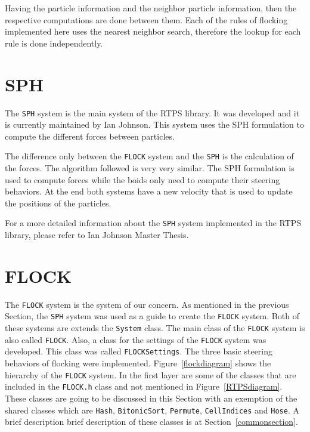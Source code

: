 Having the particle information and the neighbor particle information, then the respective computations are done between them. Each of the rules of flocking implemented here uses the nearest neighbor search, therefore the lookup for each rule is done independently.

\section{SPH}\label{sphsection}
The \texttt{SPH} system is the main system of the RTPS library. It was developed and it is currently maintained by Ian Johnson\cite{ianBlog}\cite{ianPaper}. This system uses the SPH formulation to compute the different forces between particles.

The difference only between the \texttt{FLOCK} system and the \texttt{SPH} is the calculation of the forces. The algorithm followed is very very similar. The SPH formulation is used to compute forces while the boids only need to compute their steering behaviors. At the end both systems have a new velocity that is used to update the positions of the particles.

For a more detailed information about the \texttt{SPH} system implemented in the RTPS library, please refer to Ian Johnson Master Thesis\cite{ianThesis}.

\section{FLOCK}\label{flocksection}
The \texttt{FLOCK} system is the system of our concern. As mentioned in the previous Section, the \texttt{SPH} system was used as a guide to create the \texttt{FLOCK} system. Both of these systems are extends the \texttt{System} class. The main class of the \texttt{FLOCK} system is also called \texttt{FLOCK}. Also, a class for the settings of the \texttt{FLOCK} system was developed. This class was called \texttt{FLOCKSettings}. The three basic steering behaviors of flocking were implemented. Figure~\ref{flockdiagram} shows the hierarchy of the \texttt{FLOCK} system. In the first layer are some of the classes that are included in the \texttt{FLOCK.h} class and not mentioned in Figure~\ref{RTPSdiagram}. These classes are going to be discussed in this Section with an exemption of the shared classes which are \texttt{Hash}, \texttt{BitonicSort}, \texttt{Permute}, \texttt{CellIndices} and \texttt{Hose}. A brief description brief description of these classes is at Section~\ref{commonsection}.

